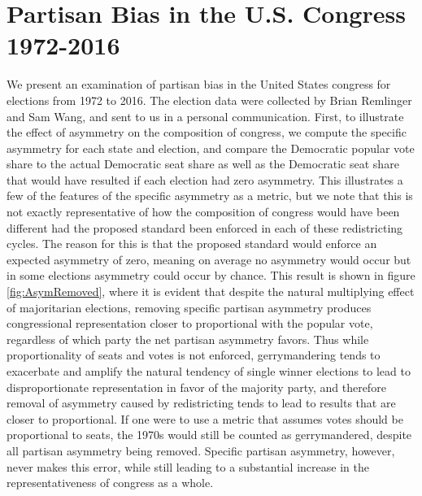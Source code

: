 \documentclass[preprint,12pt]{article}
\begin{document}
\section{Partisan Bias in the U.S. Congress 1972-2016\label{sec:Hist}}
We present an examination of partisan bias in the United States congress for elections from 1972 to 2016.
The election data were collected by Brian Remlinger and Sam Wang, and sent to us in a personal communication.
First, to illustrate the effect of asymmetry on the composition of congress, we compute the specific asymmetry for each state and election, and compare the Democratic popular vote share to the actual Democratic seat share as well as the Democratic seat share that would have resulted if each election had zero asymmetry.
This illustrates a few of the features of the specific asymmetry as a metric, but we note that this is not exactly representative of how the composition of congress would have been different had the proposed standard been enforced in each of these redistricting cycles.
The reason for this is that the proposed standard would enforce an expected asymmetry of zero, meaning on average no asymmetry would occur but in some elections asymmetry could occur by chance.
This result is shown in figure \ref{fig:AsymRemoved}, where it is evident that despite the natural multiplying effect of majoritarian elections, removing specific partisan asymmetry produces congressional representation closer to proportional with the popular vote, regardless of which party the net partisan asymmetry favors.  
Thus while proportionality of seats and votes is not enforced, gerrymandering tends to exacerbate and amplify the natural tendency of single winner elections to lead to disproportionate representation in favor of the majority party, and therefore removal of asymmetry caused by redistricting tends to lead to results that are closer to proportional.
If one were to use a metric that assumes votes should be proportional to seats, the 1970s would still be counted as gerrymandered, despite all partisan asymmetry being removed.  
Specific partisan asymmetry, however, never makes this error, while still leading to a substantial increase in the representativeness of congress as a whole.
\end{document}
